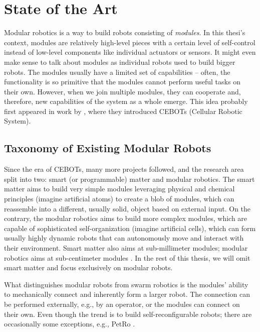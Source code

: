 \chapter{State of the Art}\label{chap:state-of-the-art}

Modular robotics is a way to build robots consisting of \emph{modules}. In this
thesi's context, modules are relatively high-level pieces with a certain level
of self-control instead of low-level components like individual actuators or
sensors. It might even make sense to talk about modules as individual robots
used to build bigger robots. The modules usually have a limited set of
capabilities -- often, the functionality is so primitive that the modules
cannot perform useful tasks on their own. However, when we join multiple
modules, they can cooperate and, therefore, new capabilities of the system as a
whole emerge. This idea probably first appeared in work by
\textcite{DBLP:conf/icra/FukudaK90}, where they introduced CEBOTs (Cellular
Robotic System).

\section{Taxonomy of Existing Modular Robots}

Since the era of CEBOTs, many more projects followed, and the research area
split into two: smart (or programmable) matter and modular robotics. The smart
matter aims to build very simple modules leveraging physical and chemical
principles (imagine artificial atoms) to create a blob of modules, which can
reassemble into a different, usually solid, object based on external input. On
the contrary, the modular robotics aims to build more complex modules, which are
capable of sophisticated self-organization (imagine artificial cells), which can
form usually highly dynamic robots that can autonomously move and interact with
their environment. Smart matter also aims at sub-millimeter modules; modular
robotics aims at sub-centimeter modules \cite{DBLP:conf/ieeealife/Christensen07,
1285597}. In the rest of this thesis, we will omit smart matter and focus
exclusively on modular robots.

What distinguishes modular robots from swarm robotics is the modules' ability to
mechanically connect and inherently form a larger robot. The connection can be
performed externally, e.g., by an operator, or the modules can connect on their
own. Even though the trend is to build self-reconfigurable robots; there are
occasionally some exceptions, e.g., PetRo \cite{DBLP:conf/ro-man/Salem14}.

